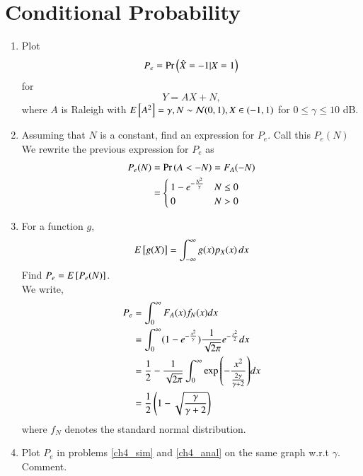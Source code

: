 \documentclass[journal,12pt,twocolumn]{IEEEtran}
\renewcommand\thesection{\arabic{section}}
\begin{document}
\section{Conditional Probability}
\begin{enumerate}[label=\thesection.\arabic*
,ref=\thesection.\theenumi]
\item
\label{ch4_sim}
Plot 
\begin{equation}
P_e = \Pr\left(\hat{X} = -1|X=1\right)
\end{equation}
%
for 
\begin{equation}
Y = AX+N,
\end{equation}
where $A$ is Raleigh with $E{}\left[A^2\right] = \gamma, N \sim \mathcal{N}(0, 1), X \in \left(-1,1\right)$ for $0 \le \gamma \le 10$ dB.

%
\item
Assuming that $N$ is a constant, find an expression for $P_e$.  Call this $P_e(N)$\\
\solution
We rewrite the previous expression for $P_e$ as
\begin{align}
	P_e(N) &= \Pr\left(A < -N\right) = F_A(-N) \\
	&= 
	\begin{cases}
		1 - e^{-\frac{N^2}{\gamma}} & N \leq 0 \\
		0 & N > 0
	\end{cases}
\end{align}
%
\item
%
\label{ch4_anal}
For a function $g$,
\begin{equation}
E{}\left[g(X)\right] = \int_{-\infty}^{\infty}g(x)p_{X}(x)\, dx
\end{equation}
%
Find $P_e = E{}\left[P_e(N)\right]$.\\
\solution
We write,
		\begin{align}
			P_e &= \int_{0}^{\infty}F_A(x)f_N(x)dx \\
			&= \int_{0}^{\infty}(1 - e^{-\frac{x^2}{\gamma}})\frac{1}{\sqrt{2\pi}}e^{-\frac{x^2}{2}}dx \\
			&= \frac{1}{2} - \frac{1}{\sqrt{2\pi}}\int_{0}^{\infty}\exp{\ensuremath{\left(-\frac{x^2}{\frac{2\gamma}{\gamma + 2}}\right)}}dx \\
			&= \frac{1}{2}\left(1 - \sqrt{\frac{\gamma}{\gamma + 2}}\right)
			\label{eq:jj}
		\end{align}
where $f_N$ denotes the standard normal distribution. 

%
\item
Plot $P_e$ in problems \ref{ch4_sim} and \ref{ch4_anal} on the same graph w.r.t $\gamma$.  Comment.

		\end{enumerate}
\end{document}
